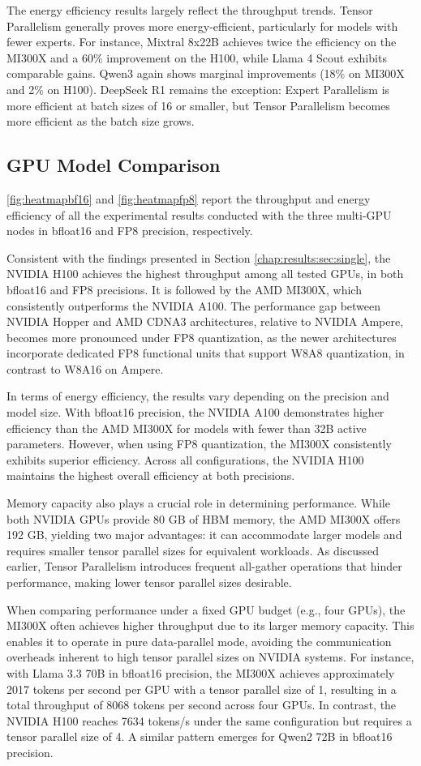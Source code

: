 The energy efficiency results largely reflect the throughput trends. Tensor Parallelism generally proves more energy-efficient, particularly for models with fewer experts. For instance, Mixtral 8x22B achieves twice the efficiency on the MI300X and a 60\% improvement on the H100, while Llama 4 Scout exhibits comparable gains. Qwen3 again shows marginal improvements (18\% on MI300X and 2\% on H100). DeepSeek R1 remains the exception: Expert Parallelism is more efficient at batch sizes of 16 or smaller, but Tensor Parallelism becomes more efficient as the batch size grows.


\subsection{GPU Model Comparison}
\ref{fig:heatmapbf16} and \ref{fig:heatmapfp8} report the throughput and energy efficiency of all the experimental results conducted with the three multi-GPU nodes in bfloat16 and FP8 precision, respectively.

Consistent with the findings presented in Section \ref{chap:results:sec:single}, the NVIDIA H100 achieves the highest throughput among all tested GPUs, in both bfloat16 and FP8 precisions. It is followed by the AMD MI300X, which consistently outperforms the NVIDIA A100. The performance gap between NVIDIA Hopper and AMD CDNA3 architectures, relative to NVIDIA Ampere, becomes more pronounced under FP8 quantization, as the newer architectures incorporate dedicated FP8 functional units that support W8A8 quantization, in contrast to W8A16 on Ampere.

In terms of energy efficiency, the results vary depending on the precision and model size. With bfloat16 precision, the NVIDIA A100 demonstrates higher efficiency than the AMD MI300X for models with fewer than 32B active parameters. However, when using FP8 quantization, the MI300X consistently exhibits superior efficiency. Across all configurations, the NVIDIA H100 maintains the highest overall efficiency at both precisions.

Memory capacity also plays a crucial role in determining performance. While both NVIDIA GPUs provide 80 GB of HBM memory, the AMD MI300X offers 192 GB, yielding two major advantages: it can accommodate larger models and requires smaller tensor parallel sizes for equivalent workloads. As discussed earlier, Tensor Parallelism introduces frequent all-gather operations that hinder performance, making lower tensor parallel sizes desirable.

When comparing performance under a fixed GPU budget (e.g., four GPUs), the MI300X often achieves higher throughput due to its larger memory capacity. This enables it to operate in pure data-parallel mode, avoiding the communication overheads inherent to high tensor parallel sizes on NVIDIA systems. For instance, with Llama 3.3 70B in bfloat16 precision, the MI300X achieves approximately 2017 tokens per second per GPU with a tensor parallel size of 1, resulting in a total throughput of 8068 tokens per second across four GPUs. In contrast, the NVIDIA H100 reaches 7634 tokens/s under the same configuration but requires a tensor parallel size of 4. A similar pattern emerges for Qwen2 72B in bfloat16 precision.

